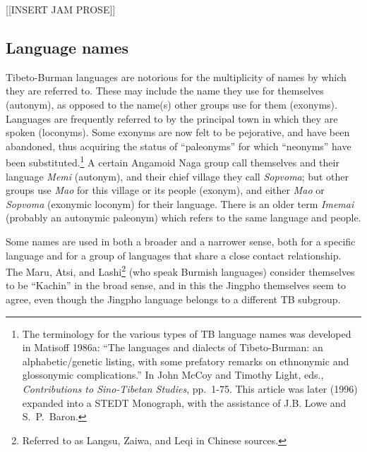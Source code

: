 [[INSERT JAM PROSE]]

\subsection{Language names}


Tibeto-Burman languages are notorious for the multiplicity of names by which
they are referred to. These may include the name they use for themselves
(autonym), as opposed to the name(s) other groups use for them (exonyms). 
Languages are frequently referred to by the principal town in which they are
spoken (loconyms).  Some exonyms are now felt to be pejorative, and have been
abandoned, thus acquiring the status of “paleonyms” for which “neonyms” have
been substituted.\footnote{The terminology for the various types of TB language
names was developed in Matisoff 1986a: “The languages and dialects of
Tibeto-Burman: an alphabetic/genetic listing, with some prefatory remarks on
ethnonymic and glossonymic complications.”  In John McCoy and Timothy Light,
eds., \textit{Contributions to Sino-Tibetan Studies},  pp.~1-75.  This article was later
(1996) expanded into a STEDT Monograph, with the assistance of J.B. Lowe and
S.\ P.\ Baron.}  A certain Angamoid Naga group call themselves and their language
\textit{Memi} (autonym), and their chief village they call \textit{Sopvoma};
but other groups use
\textit{Mao} for this village or its people (exonym), and either \textit{Mao}
or \textit{Sopvoma} (exonymic
loconym) for their language.  There is an older term \textit{Imemai} (probably an
autonymic paleonym) which refers to the same language and people.


Some names are used in both a broader and a narrower sense, both for a
specific language and for a group of languages that share a close contact
relationship.  The Maru, Atsi, and Lashi\footnote{Referred to as Langsu, Zaiwa,
and Leqi in Chinese sources.} (who speak Burmish languages) consider themselves
to be “Kachin” in the broad sense, and in this the Jingpho themselves seem to
agree, even though the Jingpho language belongs to a different TB subgroup.


